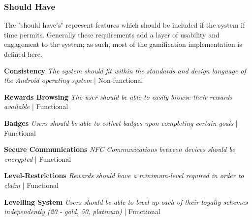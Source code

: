 \subsubsection{Should Have}
The "should have's" represent features which should be included if the system if time permits. Generally these requirements add a layer of usability and engagement to the system; as such, most of the gamification implementation is defined here.
\begin{description}[leftmargin=!,labelwidth=\widthof{\bfseries Medium}]
    \item[S1] \textbf{Consistency} \newline
        \textit{The system should fit within the standards and design language of the Android operating system}  | Non-functional
        
    \item[S2] \textbf{Rewards Browsing} \newline
        \textit{The user should be able to easily browse their rewards available}  | Functional

    \item[S3] \textbf{Badges} \newline
        \textit{Users should be able to collect badges upon completing certain goals}  | Functional

    \item[S4] \textbf{Secure Communications} \newline
        \textit{NFC Communications between devices should be encrypted}  | Functional

    \item[S5] \textbf{Level-Restrictions} \newline
        \textit{Rewards should have a minimum-level required in order to claim}  | Functional

    \item[S6] \textbf{Levelling System} \newline
        \textit{Users should be able to level up each of their loyalty schemes independently (20 - gold, 50, platinum)}  | Functional
        
\end{description}

